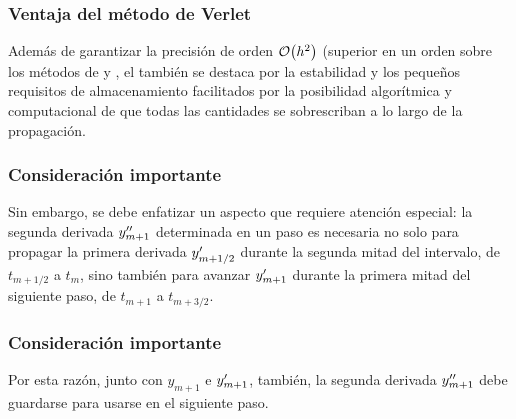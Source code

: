 \begin{frame}
\frametitle{Ventaja del método de Verlet}
Además de garantizar la precisión de orden $\order{h^{2}}$ (superior en un orden sobre los métodos de  y , el  también se destaca por la estabilidad y los pequeños requisitos de almacenamiento facilitados por la posibilidad algorítmica y computacional de que todas las cantidades se sobrescriban a lo largo de la propagación.
\end{frame}
\begin{frame}
\frametitle{Consideración importante}
Sin embargo, se debe enfatizar un aspecto que requiere atención especial: la segunda derivada ${y}^{\prime \prime}_{m+1}$ determinada en un paso es necesaria no solo para propagar la primera derivada ${y}^{\prime}_{m+1/2}$ durante la segunda mitad del intervalo, de $t_{m+1/2}$ a $t_{m}$, sino también para avanzar ${y}^{\prime}_{m+1}$ durante la primera mitad del siguiente paso, de $t_{m+1}$ a $t_{m+3/2}$.
\end{frame}
\begin{frame}
\frametitle{Consideración importante}
Por esta razón, junto con $y_{m + 1}$ e ${y}^{\prime}_{m + 1}$, también, la segunda derivada ${y}^{\prime \prime}_{m + 1}$ debe guardarse para usarse en el siguiente paso.
\end{frame}
